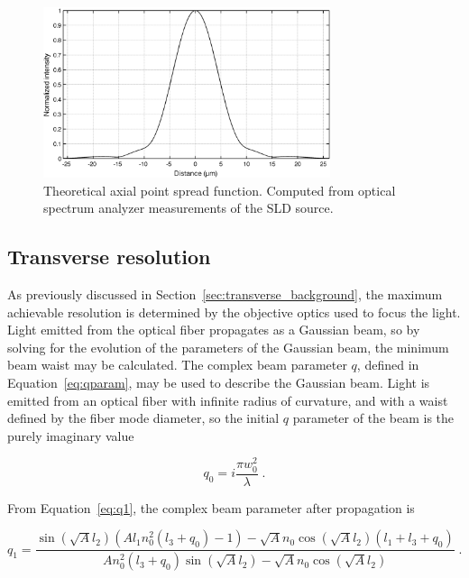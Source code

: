\begin{figure}[h!]
\centering
\includegraphics[width=0.75\textwidth]{Images/Background/theoretical_axial_psf3.png}
\caption[Theoretical axial point spread function.]{Theoretical axial point spread function. Computed from optical spectrum analyzer measurements of the SLD source.\label{fig:axial_psf_matlab}}
\end{figure}

\subsection{Transverse resolution}
\label{sec:transverse_res}

As previously discussed in Section~\ref{sec:transverse_background}, the maximum achievable resolution is determined by the objective optics used to focus the light. Light emitted from the optical fiber propagates as a Gaussian beam, so by solving for the evolution of the parameters of the Gaussian beam, the minimum beam waist may be calculated. The complex beam parameter $q$, defined in Equation~\ref{eq:qparam}, may be used to describe the Gaussian beam. Light is emitted from an optical fiber with infinite radius of curvature, and with a waist defined by the fiber mode diameter, so the initial $q$ parameter of the beam is the purely imaginary value

\begin{equation}
q_0 = i \frac{\pi w_0^2}{\lambda} \; .
\end{equation}

From Equation~\ref{eq:q1}, the complex beam parameter after propagation is

\begin{equation}
q_1 = \frac{\sin (\sqrt{A} l_2) (A l_1 n_0^2
   (l_3+q_0)-1)-\sqrt{A} n_0 \cos (\sqrt{A}
   l_2) (l_1+l_3+q_0)}{A n_0^2 (l_3+q_0) \sin
   (\sqrt{A} l_2)-\sqrt{A} n_0 \cos (\sqrt{A}
   l_2)}
   \label{eq:q1} \; .
\end{equation}

